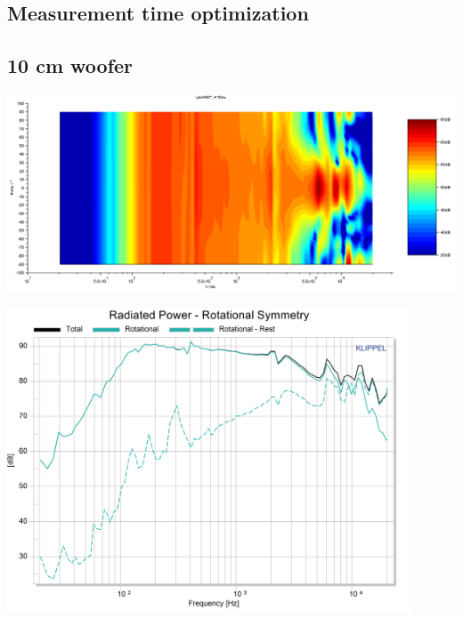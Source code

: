 \documentclass{report}
\begin{document}
\begin{appendices}
\section{Measurement time optimization}

\subsection{10 cm woofer}
\label{Curves:10cm}

\begin{minipage}{0.5\textwidth}
\begin{center}
	\includegraphics[width=.9\textwidth]{Sym/contour} 
    \captionsetup{hypcap=false} 
	\label{fig:contour_10cm}
\end{center}
\end{minipage}
\begin{minipage}{0.5\textwidth}
\begin{center}
	\includegraphics[width=0.9\textwidth]{Sym/10cm_RadPow_Rot}
    \captionsetup{hypcap=false}
\end{center}
\end{minipage}


\end{appendices}
\end{document}
